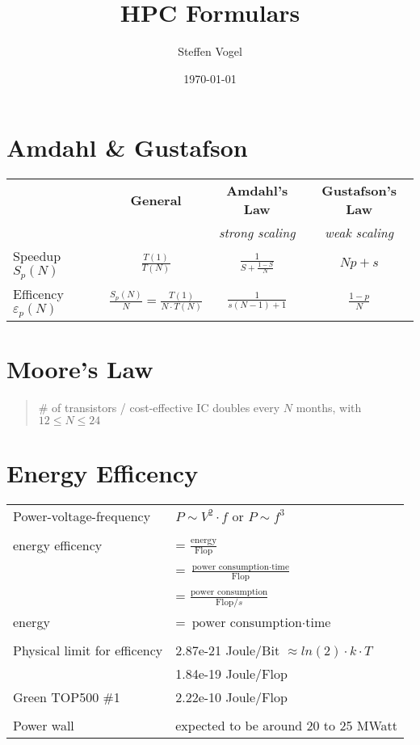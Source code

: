 \documentclass[11pt]{article}
\title{HPC Formulars}
\author{Steffen Vogel}
\date{\today}
\begin{document}
\section{Amdahl \& Gustafson}

\begin{tabular}{ l | c c c }

	& \textbf{General} & \textbf{Amdahl's Law} & \textbf{Gustafson's Law} \\
	&	  & \textit{strong scaling}	& \textit{weak scaling} \\
	\hline
	Speedup \( S_p(N) \)  & \( \frac{T(1)}{T(N)} \) & \( \frac{1}{S + \frac{1 - S}{N}} \) & \( Np + s \) \\
	Efficency \( \varepsilon_p(N) \) & \( \frac{S_p(N)}{N} = \frac{T(1)}{N \cdot T(N)} \) & \( \frac{1}{s(N-1) + 1} \) & \( \frac{1 - p}{N} \) \\
\end{tabular}

\section{Moore's Law}

\begin{quote}
	\# of transistors / cost-effective IC doubles every $N$ months, with $12 \leq N \leq 24$
\end{quote}

\section{Energy Efficency}

\begin{tabular}{ p{7cm} l }
	Power-voltage-frequency & \( P \sim V^2 \cdot f \) or \( P \sim f^3 \) \\
	& \\
	energy efficency & = \( \frac{\text{energy}}{\text{Flop}} \) \\
			 & = \( \frac{\text{power consumption} \cdot \text{time}}{\text{Flop}} \) \\
			 & = \( \frac{\text{power consumption}}{\text{Flop}/s} \) \\
	energy		 & = \( \text{power consumption} \cdot \text{time} \) \\
	& \\
	Physical limit for efficency 	& 2.87e-21 Joule/Bit \( \approx ln(2) \cdot k \cdot T \) \\
					& 1.84e-19 Joule/Flop \\
	Green TOP500 \#1		& 2.22e-10 Joule/Flop \\
	& \\
	Power wall			& expected to be around 20 to 25 MWatt \\
\end{tabular}
\end{document}
